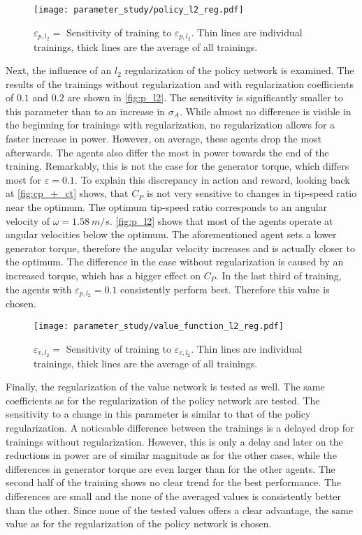 \begin{figure}[ht]
	\centering
	\texttt{[image: parameter\_study/policy\_l2\_reg.pdf]}
	\caption{$\varepsilon_{p,l_2}=$ Sensitivity of training to $\varepsilon_{p,l_2}$. Thin lines are individual trainings, thick lines are the average of all trainings.}
	\label{fig:p_l2}
\end{figure}
Next, the influence of an $l_2$ regularization of the policy network is examined. The results of the trainings without regularization and with regularization coefficients of $0.1$ and $0.2$ are shown in \autoref{fig:p_l2}. The sensitivity is significantly smaller to this parameter than to an increase in $\sigma_A$. While almost no difference is visible in the beginning for trainings with regularization, no regularization allows for a faster increase in power. However, on average, these agents drop the most afterwards. The agents also differ the most in power towards the end of the training. Remarkably, this is not the case for the generator torque, which differs most for $\varepsilon = 0.1$. To explain this discrepancy in action and reward, looking back at \autoref{fig:cp_+_ct} shows, that $C_P$ is not very sensitive to changes in tip-speed ratio near the optimum. The optimum tip-speed ratio corresponds to an angular velocity of $\omega=\SI{1.58}{m/s}$. \autoref{fig:p_l2} shows that most of the agents operate at angular velocities below the optimum. The aforementioned agent sets a lower generator torque, therefore the angular velocity increases and is actually closer to the optimum. The difference in the case without regularization is caused by an increased torque, which has a bigger effect on $C_P$. In the last third of training, the agents with $\varepsilon_{p,l_2}=0.1$ consistently perform best. Therefore this value is chosen. \\
\begin{figure}[h]%
	\centering
	\texttt{[image: parameter\_study/value\_function\_l2\_reg.pdf]}
	\caption{$\varepsilon_{v,l_2}=$ Sensitivity of training to $\varepsilon_{v,l_2}$. Thin lines are individual trainings, thick lines are the average of all trainings.}
	\label{fig:v_l2}
\end{figure}
Finally, the regularization of the value network is tested as well. The same coefficients as for the regularization of the policy network are tested. The sensitivity to a change in this parameter is similar to that of the policy regularization. A noticeable difference between the trainings is a delayed drop for trainings without regularization. However, this is only a delay and later on the reductions in power are of similar magnitude as for the other cases, while the differences in generator torque are even larger than for the other agents. The second half of the training shows no clear trend for the best performance. The differences are small and the none of the averaged values is consistently better than the other. Since none of the tested values offers a clear advantage, the same value as for the regularization of the policy network is chosen.\\
